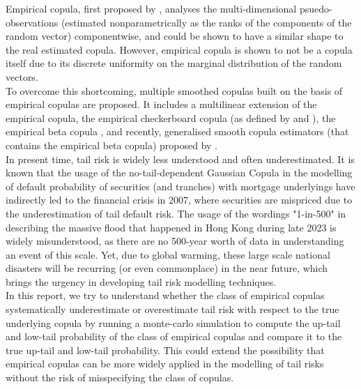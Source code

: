 \documentclass[12pt]{report}
\newcommand{\1}{\mathbf{1}}
\begin{document}
\begin{flushleft}
\vspace{0.5cm}
Empirical copula, first proposed by \cite{DeheuvelsEC}, analyses the multi-dimensional psuedo-observations (estimated nonparametrically as the ranks of the components of the random vector) componentwise, and could be shown to have a similar shape to the real estimated copula. However, empirical copula is shown to not be a copula itself due to its discrete uniformity on the marginal distribution of the random vectors. \\
\vspace{0.5cm}
To overcome this shortcoming, multiple smoothed copulas built on the basis of empirical copulas are proposed. It includes a multilinear extension of the empirical copula, the empirical checkerboard copula (as defined by \cite{CarleyTaylorECC} and \cite{HofertBook}), the empirical beta copula \parencite{SegersEBC}, and recently, generalised smooth copula estimators (that contains the empirical beta copula) proposed by \cite{KojadinovicYi2024Smooth}. \\
\vspace{0.5cm}
In present time, tail risk is widely less understood and often underestimated. It is known that the usage of the no-tail-dependent Gaussian Copula in the modelling of default probability of securities (and tranches) with mortgage underlyings have indirectly led to the financial crisis in 2007, where securities are mispriced due to the underestimation of tail default risk. The usage of the wordings "1-in-500" in describing the massive flood that happened in Hong Kong during late 2023 is widely misunderstood, as there are no 500-year worth of data in understanding an event of this scale. Yet, due to global warming, these large scale national disasters will be recurring (or even commonplace) in the near future, which brings the urgency in developing tail risk modelling techniques. \\
\vspace{0.5cm}
In this report, we try to understand whether the class of empirical copulas systematically underestimate or overestimate tail risk with respect to the true underlying copula by running a monte-carlo simulation to compute the up-tail and low-tail probability of the class of empirical copulas and compare it to the true up-tail and low-tail probability. This could extend the possibility that empirical copulas can be more widely applied in the modelling of tail risks without the risk of misspecifying the class of copulas. \\
\vspace{0.5cm}


\end{flushleft}
\end{document}
